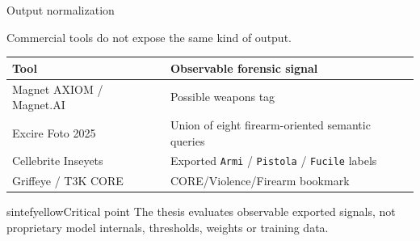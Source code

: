 \documentclass{beamer}
\begin{document}
\begin{frame}{Output normalization}

Commercial tools do not expose the same kind of output.

\begin{table}
\centering
\scriptsize
\begin{tabular}{@{}ll@{}}
\toprule
\textbf{Tool} & \textbf{Observable forensic signal} \\
\midrule
Magnet AXIOM / Magnet.AI & Possible weapons tag \\
Excire Foto 2025 & Union of eight firearm-oriented semantic queries \\
Cellebrite Inseyets & Exported \texttt{Armi} / \texttt{Pistola} / \texttt{Fucile} labels \\
Griffeye / T3K CORE & CORE/Violence/Firearm bookmark \\
\bottomrule
\end{tabular}
\end{table}

\begin{colorblock}[black]{sintefyellow}{Critical point}
The thesis evaluates observable exported signals, not proprietary model internals, thresholds, weights or training data.
\end{colorblock}

\end{frame}

\end{document}
